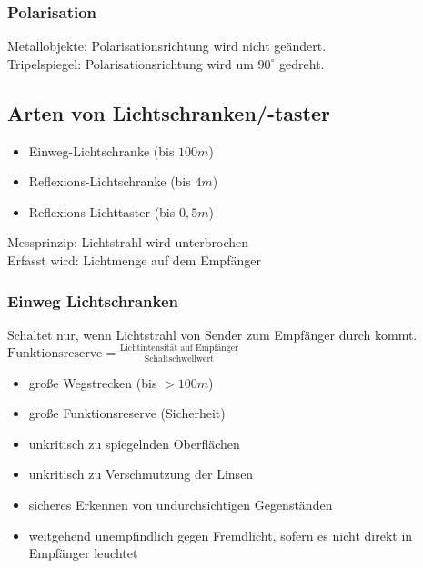 \documentclass{scrreprt}
\begin{document}
\subsubsection{Polarisation}
Metallobjekte: Polarisationsrichtung wird nicht geändert.\\
Tripelspiegel: Polarisationsrichtung wird um $90^\circ$ gedreht.

\subsection{Arten von Lichtschranken/-taster}
\begin{itemize}
\item Einweg-Lichtschranke (bis $100\unit{m}$)
\item Reflexions-Lichtschranke (bis $4 \unit{m}$)
\item Reflexions-Lichttaster (bis $0,5\unit{m}$)
\end{itemize}
Messprinzip: Lichtstrahl wird unterbrochen\\
Erfasst wird: Lichtmenge auf dem Empfänger

\subsubsection{Einweg Lichtschranken}
Schaltet nur, wenn Lichtstrahl von Sender zum Empfänger durch kommt.\\
$\text{Funktionsreserve}=\frac{\text{Lichtintensität auf Empfänger}}{\text{Schaltschwellwert}}$
\begin{itemize}[label=$+$]
\item große Wegstrecken (bis $>100\unit{m}$)
\item große Funktionsreserve (Sicherheit)
\item unkritisch zu spiegelnden Oberflächen
\item unkritisch zu Verschmutzung der Linsen
\item sicheres Erkennen von undurchsichtigen Gegenständen
\item weitgehend unempfindlich gegen Fremdlicht, sofern es nicht direkt in Empfänger leuchtet
\end{itemize}
\end{document}
